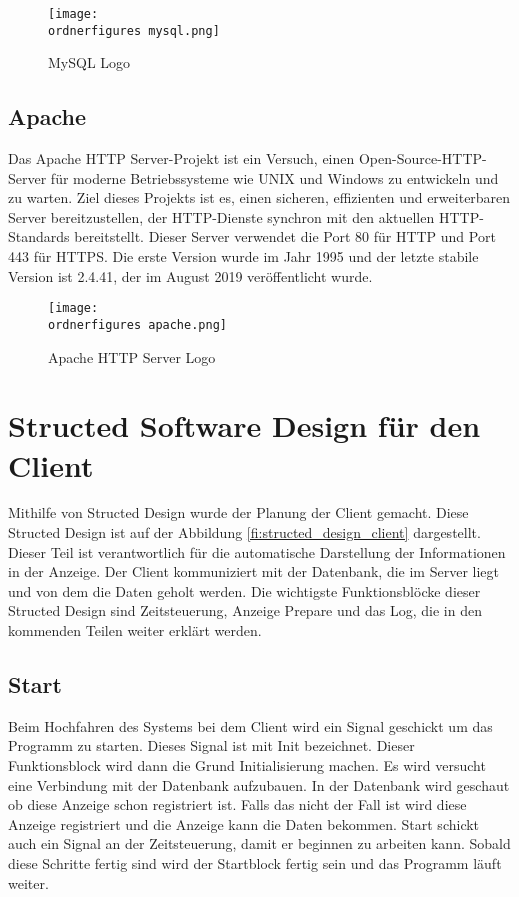 \begin{figure}[H]
	\centering
	\texttt{[image: \\ordnerfigures mysql.png]}
	\caption{MySQL Logo\cite{40_mysql_img}}
	\label{fi:mysql}
\end{figure}
\subsection{Apache}
Das Apache HTTP Server-Projekt ist ein Versuch, einen Open-Source-HTTP-Server f\"{u}r moderne Betriebssysteme wie UNIX und Windows zu entwickeln und zu warten. Ziel dieses Projekts ist es, einen sicheren, effizienten und erweiterbaren Server bereitzustellen, der HTTP-Dienste synchron mit den aktuellen HTTP-Standards bereitstellt. Dieser Server verwendet die Port 80 f\"{u}r HTTP und Port 443 f\"{u}r HTTPS. Die erste Version wurde im Jahr 1995 und der letzte stabile Version ist 2.4.41, der im August 2019 ver\"{o}ffentlicht wurde.\cite{40_apache}



\begin{figure}[H]
	\centering
	\texttt{[image: \\ordnerfigures apache.png]}
	\caption{Apache HTTP Server Logo\cite{40_apache_img}}
	\label{fi:apache}
\end{figure}


\section{Structed Software Design für den Client}

Mithilfe von Structed Design wurde der Planung der Client gemacht. Diese Structed Design ist auf der Abbildung \ref{fi:structed_design_client} dargestellt. 
Dieser Teil ist verantwortlich f\"{u}r die automatische Darstellung der Informationen in der Anzeige. Der Client kommuniziert mit der Datenbank, die im Server liegt und von dem die Daten geholt werden. Die wichtigste Funktionsbl\"{o}cke dieser Structed Design sind Zeitsteuerung, Anzeige Prepare und das Log, die in den kommenden Teilen weiter erkl\"{a}rt werden.

\subsection{Start}
Beim Hochfahren des Systems bei dem Client wird ein Signal geschickt um das Programm zu starten. Dieses Signal ist mit Init bezeichnet. Dieser Funktionsblock wird dann die Grund Initialisierung machen. Es wird versucht eine Verbindung mit der Datenbank aufzubauen. In der Datenbank wird geschaut ob diese Anzeige schon registriert ist. Falls das nicht der Fall ist wird diese Anzeige registriert und die Anzeige kann die Daten bekommen. Start schickt auch ein Signal an der Zeitsteuerung, damit er beginnen zu arbeiten kann. Sobald diese Schritte fertig sind wird der Startblock fertig sein und das Programm l\"{a}uft weiter.

